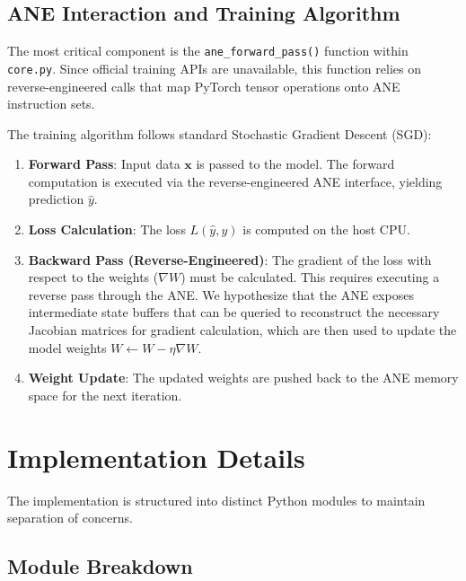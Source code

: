 \documentclass[11pt,a4paper]{article}
\begin{document}
\subsection{ANE Interaction and Training Algorithm}
The most critical component is the \texttt{ane\_forward\_pass()} function within \texttt{core.py}. Since official training APIs are unavailable, this function relies on reverse-engineered calls that map PyTorch tensor operations onto ANE instruction sets.

The training algorithm follows standard Stochastic Gradient Descent (SGD):
\begin{enumerate}
    \item \textbf{Forward Pass}: Input data $\mathbf{x}$ is passed to the model. The forward computation is executed via the reverse-engineered ANE interface, yielding prediction $\hat{y}$.
    \item \textbf{Loss Calculation}: The loss $L(\hat{y}, y)$ is computed on the host CPU.
    \item \textbf{Backward Pass (Reverse-Engineered)}: The gradient of the loss with respect to the weights ($\nabla W$) must be calculated. This requires executing a reverse pass through the ANE. We hypothesize that the ANE exposes intermediate state buffers that can be queried to reconstruct the necessary Jacobian matrices for gradient calculation, which are then used to update the model weights $W \leftarrow W - \eta \nabla W$.
    \item \textbf{Weight Update}: The updated weights are pushed back to the ANE memory space for the next iteration.
\end{enumerate}

\section{Implementation Details}
The implementation is structured into distinct Python modules to maintain separation of concerns.

\subsection{Module Breakdown}
\end{document}
